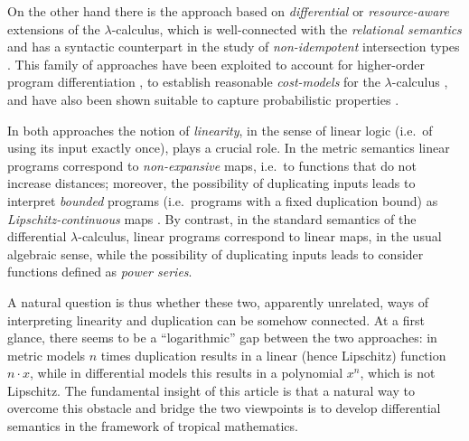 On the other hand there is the approach based on \emph{differential} \cite{difflambda} or \emph{resource-aware} \cite{Boudol1993} extensions of the $\lambda$-calculus, which is well-connected with the \emph{relational semantics} \cite{Manzo2012, Manzo2013, dill} and has a syntactic counterpart in the study of \emph{non-idempotent} intersection types \cite{decarvalho2018, Mazza2016}. This family of approaches have been exploited to account for higher-order program differentiation \cite{difflambda}, to establish reasonable \emph{cost-models} for the $\lambda$-calculus \cite{Accattoli2021}, and have also been shown suitable to capture probabilistic properties \cite{Manzo2013, Breuvart2018, PistoneLICS2022}. 


In both approaches the notion of \emph{linearity}, in the sense of linear logic \cite{girardLl} (i.e.~of using its input exactly once), plays a crucial role.
In the metric semantics linear programs correspond to \emph{non-expansive} maps, i.e.~to functions that do not increase distances; moreover, the possibility of duplicating inputs leads to interpret \emph{bounded} programs (i.e.~programs with a fixed duplication bound) as \emph{Lipschitz-continuous} maps \cite{Gaboardi2017}.
By contrast, in the standard semantics of the differential $\lambda$-calculus, linear programs correspond to linear maps, in the usual algebraic sense, while the possibility of duplicating inputs leads to consider functions defined as \emph{power series}.


A natural question is thus whether these two, apparently unrelated, ways of interpreting linearity and duplication can be somehow connected. At a first glance, there seems to be a  ``logarithmic'' gap between the two approaches:
in metric models $n$ times duplication results in a linear (hence Lipschitz) function $n\cdot x$, while in differential models this results in a polynomial $x^{n}$, which is not Lipschitz. The fundamental insight of this article is that a natural way to overcome 
this obstacle and bridge the two viewpoints 
is to develop differential semantics in the framework of 
tropical mathematics.
%
%
%



